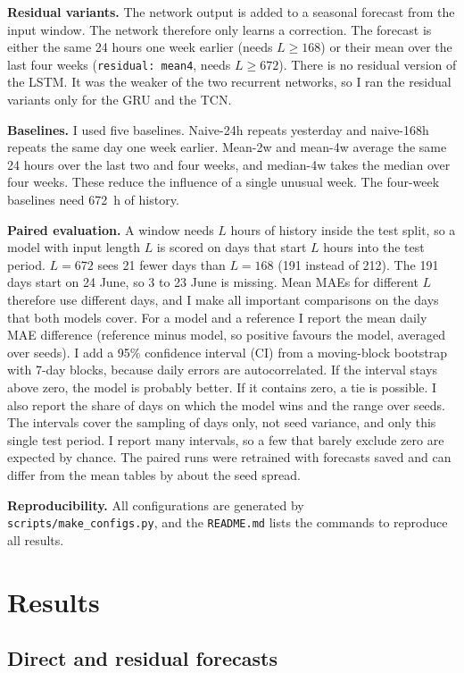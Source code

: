 \documentclass[10pt,a4paper]{article}
\begin{document}
\textbf{Residual variants.} The network output is added to a seasonal forecast from the input window. The network therefore only learns a correction. The forecast is either the same 24 hours one week earlier (needs $L\ge168$) or their mean over the last four weeks (\texttt{residual: mean4}, needs $L\ge672$). There is no residual version of the LSTM. It was the weaker of the two recurrent networks, so I ran the residual variants only for the GRU and the TCN.

\textbf{Baselines.} I used five baselines. Naive-24h repeats yesterday and naive-168h repeats the same day one week earlier. Mean-2w and mean-4w average the same 24 hours over the last two and four weeks, and median-4w takes the median over four weeks. These reduce the influence of a single unusual week. The four-week baselines need 672~h of history.

\textbf{Paired evaluation.} A window needs $L$ hours of history inside the test split, so a model with input length $L$ is scored on days that start $L$ hours into the test period. $L=672$ sees 21 fewer days than $L=168$ (191 instead of 212). The 191 days start on 24 June, so 3 to 23 June is missing. Mean MAEs for different $L$ therefore use different days, and I make all important comparisons on the days that both models cover. For a model and a reference I report the mean daily MAE difference (reference minus model, so positive favours the model, averaged over seeds). I add a 95\% confidence interval (CI) from a moving-block bootstrap with 7-day blocks, because daily errors are autocorrelated. If the interval stays above zero, the model is probably better. If it contains zero, a tie is possible. I also report the share of days on which the model wins and the range over seeds. The intervals cover the sampling of days only, not seed variance, and only this single test period. I report many intervals, so a few that barely exclude zero are expected by chance. The paired runs were retrained with forecasts saved and can differ from the mean tables by about the seed spread.

\textbf{Reproducibility.} All configurations are generated by \texttt{scripts/make\_configs.py}, and the \texttt{README.md} lists the commands to reproduce all results.

\section{Results}

\subsection{Direct and residual forecasts}\label{sec:direct}
\end{document}
